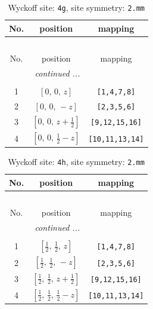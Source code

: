 \documentclass[fleqn,8pt]{jsarticle}
\begin{document}
\renewcommand{\arraystretch}{1.2}
\begin{longtable}{ccc}
\caption{Wyckoff site: {\tt 4g}, site symmetry: {\tt 2.mm}}
 \\
 \hline \hline
No. & position & mapping \\ \hline \endfirsthead

\multicolumn{2}{l}{\tablename\ \thetable{}} \\
 \hline \hline
No. & position & mapping \\ \hline \endhead

 \hline \hline
\multicolumn{2}{r}{\footnotesize\it continued ...} \\ \endfoot

 \hline \hline
\multicolumn{2}{r}{} \\ \endlastfoot

1 & $\left[ 0,\, 0,\, z \right]$ & {\tt [1,4,7,8]} \\ \hline
2 & $\left[ 0,\, 0,\, - z \right]$ & {\tt [2,3,5,6]} \\ \hline
3 & $\left[ 0,\, 0,\, z + \frac{1}{2} \right]$ & {\tt [9,12,15,16]} \\ \hline
4 & $\left[ 0,\, 0,\, \frac{1}{2} - z \right]$ & {\tt [10,11,13,14]} \\
\end{longtable}
\renewcommand{\arraystretch}{1.2}
\begin{longtable}{ccc}
\caption{Wyckoff site: {\tt 4h}, site symmetry: {\tt 2.mm}}
 \\
 \hline \hline
No. & position & mapping \\ \hline \endfirsthead

\multicolumn{2}{l}{\tablename\ \thetable{}} \\
 \hline \hline
No. & position & mapping \\ \hline \endhead

 \hline \hline
\multicolumn{2}{r}{\footnotesize\it continued ...} \\ \endfoot

 \hline \hline
\multicolumn{2}{r}{} \\ \endlastfoot

1 & $\left[ \frac{1}{2},\, \frac{1}{2},\, z \right]$ & {\tt [1,4,7,8]} \\ \hline
2 & $\left[ \frac{1}{2},\, \frac{1}{2},\, - z \right]$ & {\tt [2,3,5,6]} \\ \hline
3 & $\left[ \frac{1}{2},\, \frac{1}{2},\, z + \frac{1}{2} \right]$ & {\tt [9,12,15,16]} \\ \hline
4 & $\left[ \frac{1}{2},\, \frac{1}{2},\, \frac{1}{2} - z \right]$ & {\tt [10,11,13,14]} \\
\end{longtable}
\end{document}
